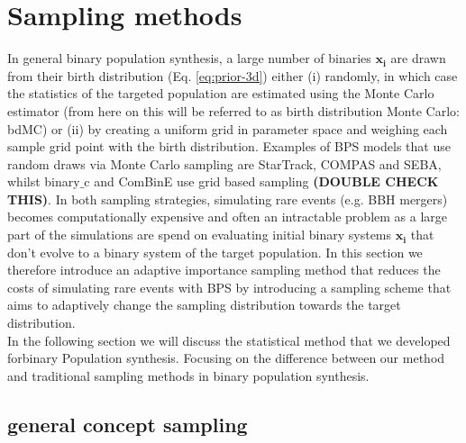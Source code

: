 \documentclass[a4paper,fleqn,usenatbib]{mnras}
\newcommand{\floor}[1]{\textbf{\textcolor{ochre}{#1}}}
\begin{document}
\section{Sampling methods}
\label{sec:sampling-methods}
In general binary population synthesis, a large number of binaries $\mathbf{x_i}$ are drawn from their birth distribution (Eq. \ref{eq:prior-3d}) either (i) randomly,  in which case the statistics of the targeted population are estimated using the Monte Carlo estimator (from here on this will be referred to as birth distribution Monte Carlo: bdMC)  or (ii) by creating a uniform grid in parameter space and weighing each sample grid point with the birth distribution. 
Examples of BPS models that use random draws via Monte Carlo sampling are StarTrack, COMPAS and SEBA, whilst binary$\_$c and ComBinE use grid based sampling \floor{(DOUBLE CHECK THIS)}.
In both sampling strategies, simulating rare events (e.g. BBH mergers) becomes computationally expensive and often an intractable problem as a large part of the simulations are spend on evaluating initial binary systems $\mathbf{x_i}$ that don't evolve to a binary system of the target population. In this section we therefore introduce an adaptive importance sampling method that reduces the costs of simulating rare events with BPS by introducing a sampling scheme that aims to adaptively change the sampling distribution towards the target distribution.  \\

In the following section we will discuss the statistical method that we developed forbinary Population synthesis. Focusing on the difference between our method and traditional sampling methods in binary population synthesis.  \\


\subsection{general concept sampling}
\end{document}
